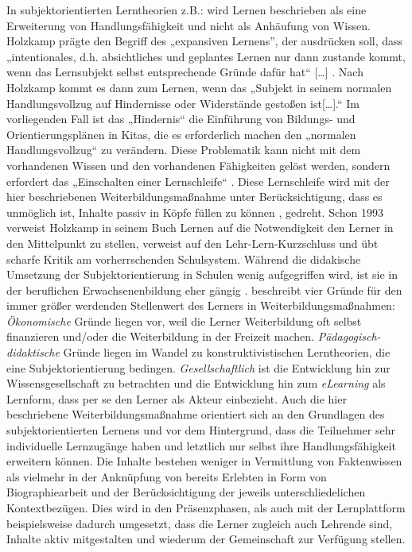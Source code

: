 \documentclass[12pt, bibliography=totoc]{scrartcl}
\begin{document}
In subjektorientierten Lerntheorien z.B.: \parencite{Holzkamp2004} wird
Lernen beschrieben als eine Erweiterung von Handlungsfähigkeit und nicht
als Anhäufung von Wissen. Holzkamp prägte den Begriff des „expansiven
Lernens'', der ausdrücken soll, dass „intentionales, d.h. absichtliches
und geplantes Lernen nur dann zustande kommt, wenn das Lernsubjekt
selbst entsprechende Gründe dafür hat`` {[}\ldots{]}
\parencite[29]{Holzkamp2004}. Nach Holzkamp kommt es dann zum Lernen,
wenn das „Subjekt in seinem normalen Handlungsvollzug auf Hindernisse
oder Widerstände gestoßen ist{[}\ldots{]}.`` Im vorliegenden Fall ist
das „Hindernis`` die Einführung von Bildungs- und Orientierungsplänen in
Kitas, die es erforderlich machen den „normalen Handlungsvollzug`` zu
verändern. Diese Problematik kann nicht mit dem vorhandenen Wissen und
den vorhandenen Fähigkeiten gelöst werden, sondern erfordert das
„Einschalten einer Lernschleife`` \parencite[29]{Holzkamp2004}. Diese
Lernschleife wird mit der hier beschriebenen Weiterbildungsmaßnahme
unter Berücksichtigung, dass es unmöglich ist, Inhalte passiv in Köpfe
füllen zu können \parencite[12]{Faulstich2012}, gedreht. Schon 1993
verweist Holzkamp in seinem Buch Lernen auf die Notwendigkeit den Lerner
in den Mittelpunkt zu stellen, verweist auf den Lehr-Lern-Kurzschluss
und übt scharfe Kritik am vorherrschenden Schulsystem. Während die
didakische Umsetzung der Subjektorientierung in Schulen wenig
aufgegriffen wird, ist sie in der beruflichen Erwachsenenbildung eher
gängig \parencite{grotluschen2005expansives}.
\textcite[138]{ehlers2011qualitat} beschreibt vier Gründe für den immer
größer werdenden Stellenwert des Lerners in Weiterbildungsmaßnahmen:
\emph{Ökonomische} Gründe liegen vor, weil die Lerner Weiterbildung oft
selbst finanzieren und/oder die Weiterbildung in der Freizeit machen.
\emph{Pädagogisch-didaktische} Gründe liegen im Wandel zu
konstruktivistischen Lerntheorien, die eine Subjektorientierung
bedingen. \emph{Gesellschaftlich} ist die Entwicklung hin zur
Wissensgesellschaft zu betrachten und die Entwicklung hin zum
\emph{eLearning} als Lernform, dass per se den Lerner als Akteur
einbezieht. Auch die hier beschriebene Weiterbildungsmaßnahme orientiert
sich an den Grundlagen des subjektorientierten Lernens und vor dem
Hintergrund, dass die Teilnehmer sehr individuelle Lernzugänge haben und
letztlich nur selbst ihre Handlungsfähigkeit erweitern können. Die
Inhalte bestehen weniger in Vermittlung von Faktenwissen als vielmehr in
der Anknüpfung von bereits Erlebten in Form von Biographiearbeit und der
Berücksichtigung der jeweils unterschliedelichen Kontextbezügen. Dies
wird in den Präsenzphasen, als auch mit der Lernplattform beispielsweise
dadurch umgesetzt, dass die Lerner zugleich auch Lehrende sind, Inhalte
aktiv mitgestalten und wiederum der Gemeinschaft zur Verfügung stellen.
\end{document}
